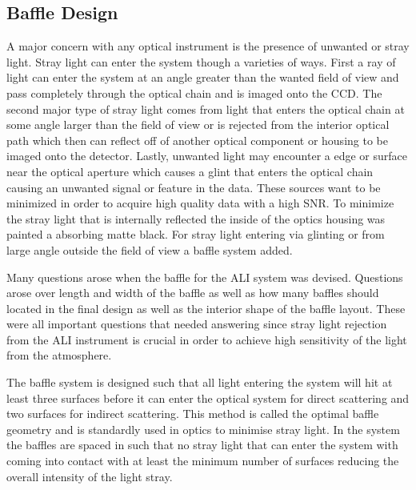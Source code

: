 \subsection{Baffle Design}

A major concern with any optical instrument is the presence of unwanted or stray light. Stray light can enter the system though a varieties of ways. First a ray of light can enter the system at an angle greater than the wanted field of view and pass completely through the optical chain and is imaged onto the CCD. The second major type of stray light comes from light that enters the optical chain at some angle larger than the field of view or is rejected from the interior optical path which then can reflect off of another optical component or housing to be imaged onto the detector. Lastly, unwanted light may encounter a edge or surface near the optical aperture which causes a glint that enters the optical chain causing an unwanted signal or feature in the data. These sources want to be minimized in order to acquire high quality data with a high SNR. To minimize the stray light that is internally reflected the inside of the optics housing was painted a absorbing matte black. For stray light entering via glinting or from large angle outside the field of view a baffle system added. 

Many questions arose when the baffle for the ALI system was devised. Questions arose over length and width of the baffle as well as how many baffles should located in the final design as well as the interior shape of the baffle layout. These were all important questions that needed answering since stray light rejection from the ALI instrument is crucial in order to achieve high sensitivity of the light from the atmosphere.

The baffle system is designed such that all light entering the system will hit at least three surfaces before it can enter the optical system for direct scattering and two surfaces for indirect scattering. This method is called the optimal baffle geometry and is standardly used in optics to minimise stray light. In the system the baffles are spaced in such that no stray light that can enter the system with coming into contact with at least the minimum number of surfaces reducing the overall intensity of the light stray.

